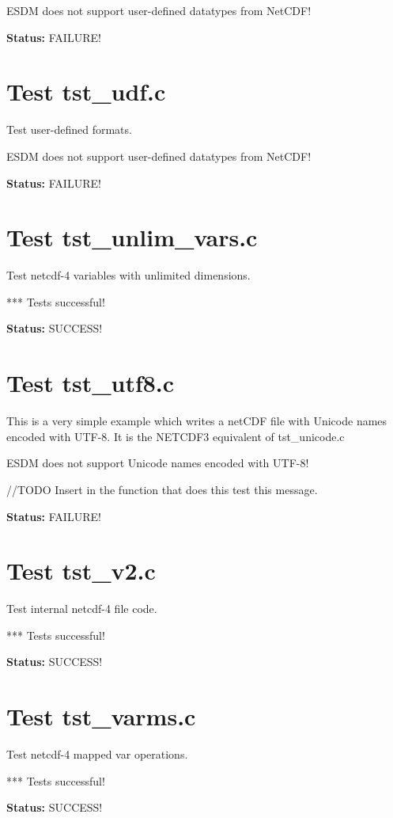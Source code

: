 ESDM does not support user-defined datatypes from NetCDF!

{\bf \large Status: } FAILURE!

\section{Test tst\_udf.c}

Test user-defined formats.

ESDM does not support user-defined datatypes from NetCDF!

{\bf \large Status: } FAILURE!

\section{Test tst\_unlim\_vars.c}

Test netcdf-4 variables with unlimited dimensions.

*** Tests successful!

{\bf \large Status: } SUCCESS!

\section{Test tst\_utf8.c}

This is a very simple example which writes a netCDF file with Unicode names encoded with UTF-8. It is the NETCDF3 equivalent of tst\_unicode.c

ESDM does not support Unicode names encoded with UTF-8!

//TODO Insert in the function that does this test this message.

{\bf \large Status: } FAILURE!

\section{Test tst\_v2.c}

Test internal netcdf-4 file code.

*** Tests successful!

{\bf \large Status: } SUCCESS!

\section{Test tst\_varms.c}

Test netcdf-4 mapped var operations.

*** Tests successful!

{\bf \large Status: } SUCCESS!

